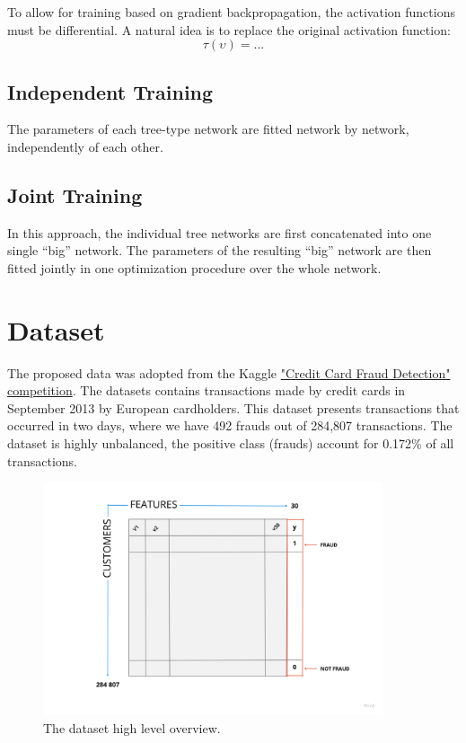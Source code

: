 \documentclass{article}
\begin{document}
To allow for training based on gradient backpropagation, the activation functions must be differential. A natural idea is to replace the original activation function:
\[ \tau(\upsilon)= \dots  \]

\subsection{Independent Training}
The parameters of each tree-type network are fitted network by network, independently of each other.

\subsection{Joint Training}
In this approach, the individual tree networks are first concatenated into one single “big” network. The parameters of the resulting “big” network are then fitted jointly in one optimization procedure over the whole network.

\section{Dataset}
The proposed data was adopted from the Kaggle \href{https://www.kaggle.com/mlg-ulb/creditcardfraud}{"Credit Card Fraud Detection" competition}. The datasets contains transactions made by credit cards in September 2013 by European cardholders. 
This dataset presents transactions that occurred in two days, where we have 492 frauds out of 284,807 transactions. The dataset is highly unbalanced, the positive class (frauds) account for 0.172\% of all transactions.

\begin{figure}[h]
    \centering \includegraphics[width=10cm]{images/DATASET.jpg}
    \caption {The dataset high level overview.}
    \label{fig:ct_spine}
\end{figure}
\end{document}
